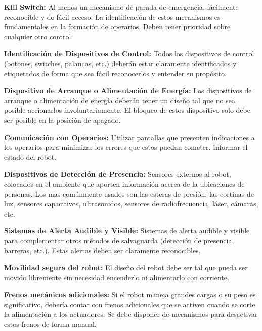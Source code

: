 \documentclass[withindex,glossary]{cam-thesis}
\begin{document}
\textbf{Kill Switch:} Al menos un mecanismo de parada de emergencia, fácilmente reconocible y de fácil acceso. La identificación de estos mecanismos es fundamentales en la formación de operarios. Deben tener prioridad sobre cualquier otro control.

\textbf{Identificación de Dispositivos de Control:} Todos los dispositivos de control (botones, switches, palancas, etc.) deberán estar claramente identificados y etiquetados de forma que sea fácil reconocerlos y entender su propósito.

\textbf{Dispositivo de Arranque o Alimentación de Energía:} Los dispositivos de arranque o alimentación de energía deberán tener un diseño tal que no sea posible accionarlos involuntariamente. El bloqueo de estos dispositivo solo debe ser posible en la posición de apagado.

\textbf{Comunicación con Operarios:} Utilizar pantallas que presenten indicaciones a los operarios para minimizar los errores que estos puedan cometer. Informar el estado del robot.

\textbf{Dispositivos de Detección de Presencia:} Sensores externos al robot, colocados en el ambiente que aporten información acerca de la ubicaciones de personas. Los mas comúnmente usados son las esteras de presión, las cortinas de luz, sensores capacitivos, ultrasonidos, sensores de radiofrecuencia, láser, cámaras, etc.

\textbf{Sistemas de Alerta Audible y Visible:} Sistemas de alerta audible y visible para complementar otros métodos de salvaguarda (detección de presencia, barreras, etc.). Estas alertas deben ser claramente reconocibles.

\textbf{Movilidad segura del robot:} El diseño del robot debe ser tal que pueda ser movido libremente sin necesidad encenderlo ni alimentarlo con corriente.

\textbf{Frenos mecánicos adicionales:} Si el robot maneja grandes cargas o su peso es significativo, debería contar con frenos adicionales que se activen cuando se corte la alimentación a los actuadores. Se debe disponer de mecanismos para desactivar estos frenos de forma manual.
\end{document}
